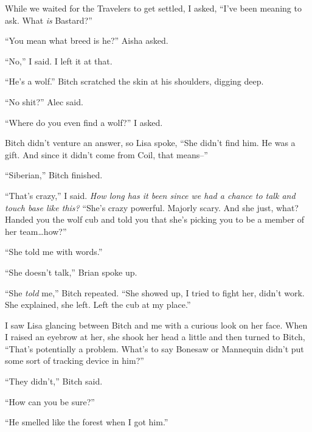 While we waited for the Travelers to get settled, I asked, ``I've been meaning to ask.  What \emph{is} Bastard?''



``You mean what breed is he?'' Aisha asked.



``No,'' I said.  I left it at that.



``He's a wolf.''  Bitch scratched the skin at his shoulders, digging deep.



``No shit?'' Alec said.



``Where do you even find a wolf?'' I asked.



Bitch didn't venture an answer, so Lisa spoke, ``She didn't find him.  He was a gift.  And since it didn't come from Coil, that means--''



``Siberian,'' Bitch finished.



``That's crazy,'' I said.  \emph{How long has it been since we had a chance to talk and touch base like this?}  ``She's crazy powerful.  Majorly scary.  And she just, what?  Handed you the wolf cub and told you that she's picking you to be a member of her team\ldots how?''



``She told me with words.''



``She doesn't talk,'' Brian spoke up.



``She \emph{told} me,'' Bitch repeated.  ``She showed up, I tried to fight her, didn't work.  She explained, she left.  Left the cub at my place.''



I saw Lisa glancing between Bitch and me with a curious look on her face.  When I raised an eyebrow at her, she shook her head a little and then turned to Bitch, ``That's potentially a problem.  What's to say Bonesaw or Mannequin didn't put some sort of tracking device in him?''



``They didn't,'' Bitch said.



``How can you be sure?''



``He smelled like the forest when I got him.''




